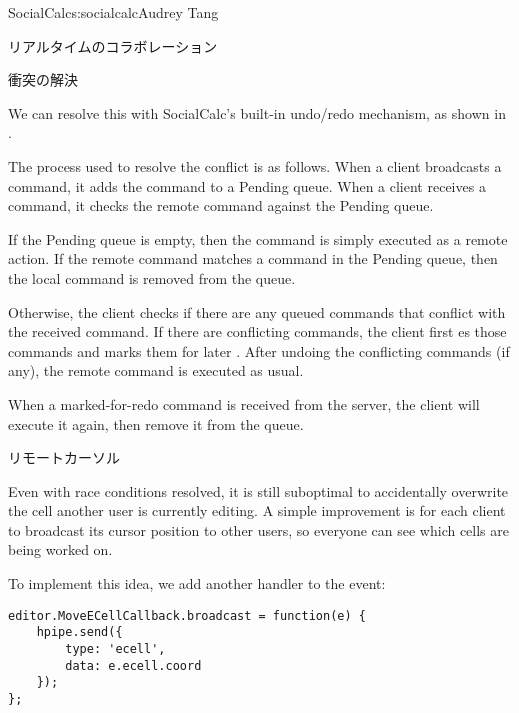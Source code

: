 \begin{aosachapter}{SocialCalc}{s:socialcalc}{Audrey Tang}
\begin{aosasect1}{リアルタイムのコラボレーション}
\begin{aosasect2}{衝突の解決}

We can resolve this with SocialCalc's built-in undo/redo mechanism, as
shown in .


The process used to resolve the conflict is as follows.  When a client
broadcasts a command, it adds the command to a Pending queue.  When a client
receives a command, it checks the remote command against the Pending queue.

If the Pending queue is empty, then the command is simply executed as a remote
action. If the remote command matches a command in the Pending queue, then the
local command is removed from the queue.

Otherwise, the client checks if there are any queued commands that conflict
with the received command.  If there are conflicting commands, the client first
es those commands and marks them for later .  After
undoing the conflicting commands (if any), the remote command is executed as
usual.

When a marked-for-redo command is received from the server, the client will
execute it again, then remove it from the queue.


\end{aosasect2}

\begin{aosasect2}{リモートカーソル}

Even with race conditions resolved, it is still suboptimal to
accidentally overwrite the cell another user is currently editing.  A
simple improvement is for each client to broadcast its cursor position
to other users, so everyone can see which cells are being worked on.

To implement this idea, we add another  handler to the
 event:

\begin{verbatim}
editor.MoveECellCallback.broadcast = function(e) {
    hpipe.send({
        type: 'ecell',
        data: e.ecell.coord
    });
};


\end{verbatim}
\end{aosasect2}
\end{aosasect1}
\end{aosachapter}
